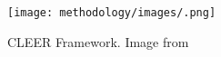\begin{figure} [!h]
\centering
\texttt{[image: methodology/images/.png]}
\caption[CLEER Framework]{CLEER Framework.  Image from \cite{CLEER13}}
\label{img_cleer}
\end{figure}